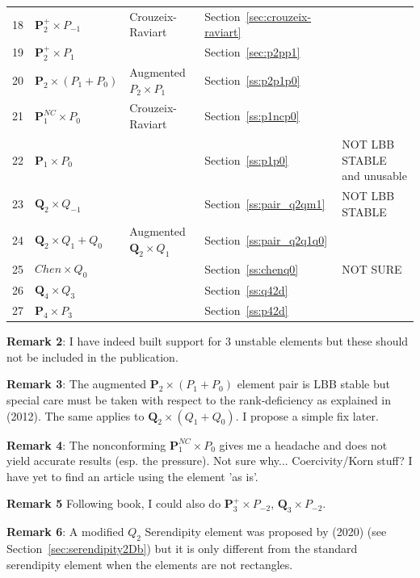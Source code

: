 \begin{center}
\begin{tabular}{p{1cm}p{2cm}p{4cm}p{2.5cm}p{5cm}}
18&${\bm P}_2^+\times P_{-1}$  & Crouzeix-Raviart & Section~\ref{sec:crouzeix-raviart}\\
19&${\bm P}_2^+\times P_{1}$   &                  & Section~\ref{sec:p2pp1}\\
20&${\bm P}_2\times (P_1+P_0)$ & Augmented $P_2\times P_1$ & Section~\ref{ss:p2p1p0}\\
21&${\bm P}_1^{NC}\times P_0$  & Crouzeix-Raviart & Section~\ref{ss:p1ncp0}\\
22&${\bm P}_1\times P_0$       &                  & Section~\ref{ss:p1p0}  &NOT LBB STABLE and unusable\\
23&${\bm Q}_2\times Q_{-1}$    &                  & Section~\ref{ss:pair_q2qm1} & NOT LBB STABLE\\
24&${\bm Q}_2\times Q_1+Q_0$   & Augmented ${\bm Q}_2\times Q_1$ & Section~\ref{ss:pair_q2q1q0} \\
25&$Chen\times Q_0$      &                  & Section~\ref{ss:chenq0} & NOT SURE \\
26&${\bm Q}_4\times Q_3$       &                  & Section~\ref{ss:q42d}\\
27&${\bm P}_4\times P_3$       &                  & Section~\ref{ss:p42d}\\
\hline
\end{tabular}
\end{center}


{\bf Remark 2}: I have indeed built support for 3 unstable elements but 
these should not be included in the publication. 

{\bf Remark 3}: The augmented ${\bm P}_2\times (P_1+P_0)$ element pair is LBB stable 
but special care must be taken with respect to the rank-deficiency 
as explained in \textcite{bocg12} (2012). The same applies to ${\bm Q}_2\times (Q_1+Q_0)$. 
I propose a simple fix later. 

{\bf Remark 4}: The nonconforming ${\bm P}_1^{NC}\times P_0$ gives me a headache and does not 
yield accurate results (esp. the pressure). Not sure why... Coercivity/Korn stuff? I
have yet to find an article using the element 'as is'.

{\bf Remark 5} Following \textcite{john16} book, I could also do 
${\bm P}_3^+\times P_{-2}$, ${\bm Q}_3\times P_{-2}$. 

{\bf Remark 6}: A modified $Q_2$ Serendipity element was proposed by \textcite{zhxi20} (2020) 
(see Section~\ref{sec:serendipity2Db}) but it is only different from the standard serendipity 
element when the elements are not rectangles. 

